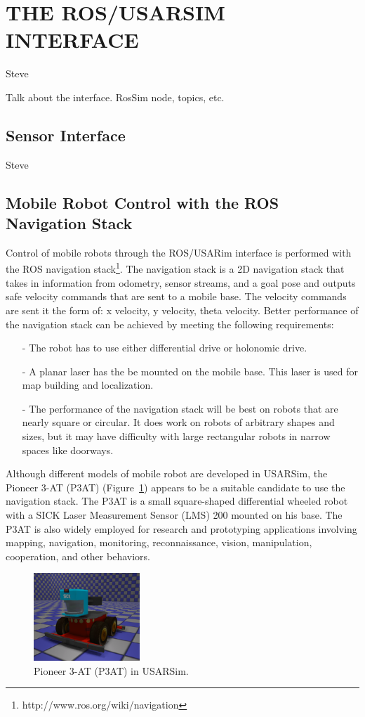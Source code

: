 \section*{THE ROS/USARSIM INTERFACE}\label{s:interface}
Steve

Talk about the interface. RosSim node, topics, etc.
\subsection*{Sensor Interface}
Steve
\subsection*{Mobile Robot Control with the ROS Navigation Stack}
Control of mobile robots through the ROS/USARim interface is performed with the ROS navigation stack\footnote{http://www.ros.org/wiki/navigation}. The navigation stack is a 2D navigation stack that takes in information from odometry, sensor streams, and a goal pose and outputs safe velocity commands that are sent to a mobile base. The velocity commands are sent it the form of: x velocity, y velocity, theta velocity. Better performance of the navigation stack can be achieved by meeting the following requirements:
\begin{itemize}
\item[-] The robot has to use either differential drive or holonomic drive.
\item[-] A planar laser has the be mounted on the mobile base. This laser is used for map building and localization.
\item[-] The performance of the navigation stack will be best on robots that are nearly square or circular. It does work on robots of arbitrary shapes and sizes, but it may have difficulty with large rectangular robots in narrow spaces like doorways.
\end{itemize}

Although different models of mobile robot are developed in USARSim, the Pioneer 3-AT (P3AT) (Figure~\ref{fig:p3at}) appears to be a suitable candidate to use the navigation stack. The P3AT is a small square-shaped differential wheeled robot with a SICK Laser Measurement Sensor (LMS) 200 mounted on his base. The P3AT is also widely employed for research and prototyping applications involving mapping, navigation, monitoring, reconnaissance, vision, manipulation, cooperation, and other behaviors.

\begin{figure}[t!]
\centering
\includegraphics[width=4cm]{Figures/Robots/P3AT.eps}
\caption{Pioneer 3-AT (P3AT) in USARSim.}\label{fig:p3at}
\end{figure}




